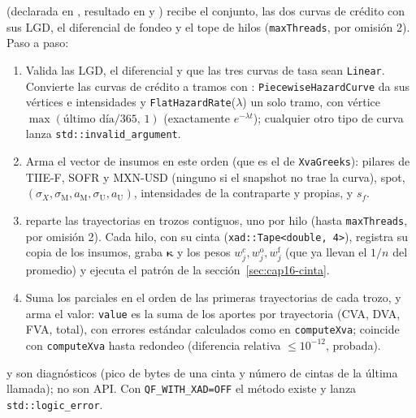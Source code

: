 \begin{sloppypar}
 (declarada en
, resultado en
 y )
recibe el conjunto, las dos curvas de crédito con sus LGD, el diferencial de fondeo y el tope de hilos
(\texttt{maxThreads}, por omisión 2). Paso a paso:
\begin{enumerate}
  \item Valida las LGD, el diferencial y que las tres curvas de tasa sean \texttt{Linear}. Convierte las curvas de
        crédito a tramos con : \texttt{PiecewiseHazardCurve} da sus
        vértices e intensidades y \texttt{FlatHazardRate}($\lambda$) un solo tramo, con vértice
        $\max(\text{último día}/365,\,1)$ (exactamente $e^{-\lambda t}$); cualquier otro tipo de curva lanza
        \texttt{std::invalid\_argument}.
  \item Arma el vector de insumos en este orden (que es el de \texttt{XvaGreeks}): pilares de TIIE-F, SOFR y
        MXN-USD (ninguno si el snapshot no trae la curva), spot, $(\sigma_X,\sigma_{\mathrm M},a_{\mathrm M},\sigma_{\mathrm U},a_{\mathrm U})$,
        intensidades de la contraparte y propias, y $s_f$.
  \item {} reparte las trayectorias en trozos contiguos, uno por
        hilo (hasta \texttt{maxThreads}, por omisión 2). Cada hilo, con su cinta
        (\texttt{xad::Tape<double, 4>}), registra su copia de los insumos, graba $\boldsymbol\kappa$ y los pesos
        $w^{\mathrm c}_j,w^{\mathrm o}_j,w^{\mathrm f}_j$ (que ya llevan el $1/n$ del promedio) y ejecuta el patrón de
        la sección~\ref{sec:cap16-cinta}.
  \item Suma los parciales en el orden de las primeras trayectorias de cada trozo, y arma el valor:
        \texttt{value} es la suma de los aportes por trayectoria (CVA, DVA, FVA, total), con errores estándar
        calculados como en \texttt{computeXva}; coincide con \texttt{computeXva} hasta redondeo
        (diferencia relativa $\le10^{-12}$, probada).
\end{enumerate}
 y  son
diagnósticos (pico de bytes de una cinta y número de cintas de la última llamada); no son API. Con
\texttt{QF\_WITH\_XAD=OFF} el método existe y lanza \texttt{std::logic\_error}.


\end{sloppypar}
